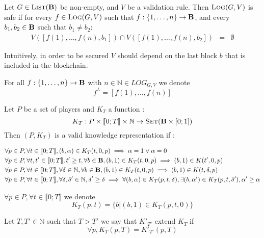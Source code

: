 \begin{mydef}
Let $G \in \text{\sc List}(\text{\bf B})$ be non-empty, and $V$ be a validation rule. Then $\text{\sc Log}(G,V)$ is safe if for every $f \in \text{\sc Log}(G,V)$ such that $f : \{1, \ldots, n\} \to \text{\bf B}$, and every $b_1, b_2 \in \text{\bf B}$ such that $b_1 \neq b_2$:
\begin{eqnarray*}
V([f(1), \ldots, f(n), b_1]) \cap V([f(1), \ldots, f(n), b_2]) & = & \emptyset
\end{eqnarray*}
\end{mydef}
Intuitively, in order to be secured $V$ should depend on the last block $b$ that is included in the blockchain.

\begin{mynota}
	For all $f : \{1, \ldots, n\} \rightarrow \text{\bf B}$ with $n \in \mathbb{N} \in LOG_{G,V}$ we denote $$f^L = [f(1), \ldots, f(n)]$$
\end{mynota}

\begin{mydef}
Let $P$ be a set of players and $K_T$ a function :
$$K_{T} : P \times \llbracket 0;T \rrbracket \times \mathbb{N} \rightarrow \text{\sc Set}(\text{\bf B} \times [0;1])$$ 
Then $(P,K_{T})$ is a valid knowledge representation if :

\begin{eqnarray*}
&\forall p \in P,\forall t\in \llbracket 0;T \rrbracket, (b,\alpha) \in K_{T}(t,0,p) \implies \alpha = 1 \lor \alpha = 0\\
&\forall p \in P,\forall t,t'\in \llbracket 0;T \rrbracket, t' \geq t, \forall b \in \text{\bf B},  (b,1) \in K_{T}(t,0,p) \implies (b,1) \in K(t',0,p)  \\
&\forall p \in P,\forall t\in \llbracket 0;T \rrbracket, \forall \delta \in \mathbb{N}, \forall b \in \text{\bf B},  (b,1) \in K_{T}(t,0,p) \implies (b,1) \in K(t,\delta,p) \\
&\forall p \in P,\forall t\in \llbracket 0;T \rrbracket, \forall \delta,\delta' \in \mathbb{N}, \delta' \geq \delta \implies \forall (b,\alpha) \in K_{T}(p,t,\delta), \exists (b,\alpha') \in K_{T}(p,t,\delta'), \alpha'\geq \alpha\\
\end{eqnarray*}
\end{mydef}

\begin{mynota}
	$\forall p \in P, \forall t\in \llbracket 0;T \rrbracket$ we denote $$K_{T}(p,t)=\{b | (b,1) \in K_{T}(p,t,0)\}$$
\end{mynota}

\begin{mydef}
	Let $T,T' \in \mathbb{N}$ such that $T>T'$ we say that $K'_{T'}$ extend $K_{T}$ if $$\forall p, K_{T}(p,T) = K'_{T'}(p,T)$$
\end{mydef}

